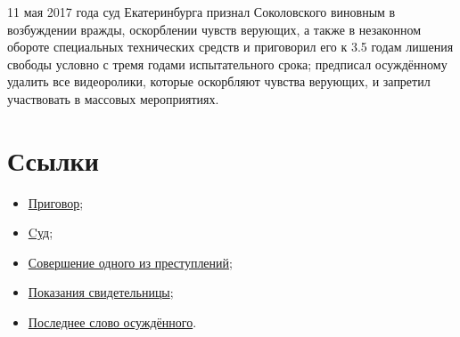 \documentclass[a4paper]{article}
\begin{document}
		11 мая 2017 года суд Екатеринбурга признал Соколовского виновным в возбуждении вражды, оскорблении чувств верующих, а также в незаконном обороте специальных технических средств и приговорил его к 3.5 годам лишения свободы условно с тремя годами испытательного срока; предписал осуждённому удалить все видеоролики, которые оскорбляют чувства верующих, и запретил участвовать в массовых мероприятиях.
	
	\section{Ссылки}
		
		\begin{itemize}
			\item \href{https://verhisetsky--svd.sudrf.ru/modules.php?name=sud_delo&srv_num=2&name_op=case&case_id=288607166&case_uid=65bfc677-ea10-4cb5-8357-d0bce09c973c&delo_id=1540006&new=}{Приговор};
			
			\item \href{https://www.youtube.com/watch?v=s2pY4zCnUFQ&t=3093s}{Cуд};
			
			\item \href{https://www.youtube.com/watch?v=xlLUFwO1hbY&t=67s}{Совершение одного из преступлений};
			
			\item \href{https://www.youtube.com/watch?v=hEg0MCSr098}{Показания свидетельницы};
			
			\item \href{https://www.youtube.com/watch?v=0zZ07pV9s1g}{Последнее слово осуждённого}.
		\end{itemize}
		
\end{document}
